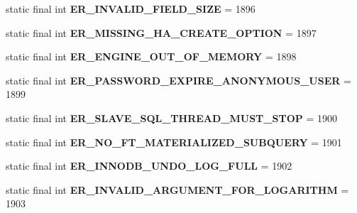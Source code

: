 \begin{DoxyCompactItemize}
static final int {\bfseries E\+R\+\_\+\+I\+N\+V\+A\+L\+I\+D\+\_\+\+F\+I\+E\+L\+D\+\_\+\+S\+I\+ZE} = 1896
\item 
\mbox{\label{classcom_1_1mysql_1_1jdbc_1_1_mysql_error_numbers_aecd3449fd42daf16bb620fba01c78c19}} 
static final int {\bfseries E\+R\+\_\+\+M\+I\+S\+S\+I\+N\+G\+\_\+\+H\+A\+\_\+\+C\+R\+E\+A\+T\+E\+\_\+\+O\+P\+T\+I\+ON} = 1897
\item 
\mbox{\label{classcom_1_1mysql_1_1jdbc_1_1_mysql_error_numbers_a9d574c71aee52af3e2d54cef3ee07a3a}} 
static final int {\bfseries E\+R\+\_\+\+E\+N\+G\+I\+N\+E\+\_\+\+O\+U\+T\+\_\+\+O\+F\+\_\+\+M\+E\+M\+O\+RY} = 1898
\item 
\mbox{\label{classcom_1_1mysql_1_1jdbc_1_1_mysql_error_numbers_ac57d765d78e94473b0d8706706491741}} 
static final int {\bfseries E\+R\+\_\+\+P\+A\+S\+S\+W\+O\+R\+D\+\_\+\+E\+X\+P\+I\+R\+E\+\_\+\+A\+N\+O\+N\+Y\+M\+O\+U\+S\+\_\+\+U\+S\+ER} = 1899
\item 
\mbox{\label{classcom_1_1mysql_1_1jdbc_1_1_mysql_error_numbers_a51f840d671bfa27756f2d97104673652}} 
static final int {\bfseries E\+R\+\_\+\+S\+L\+A\+V\+E\+\_\+\+S\+Q\+L\+\_\+\+T\+H\+R\+E\+A\+D\+\_\+\+M\+U\+S\+T\+\_\+\+S\+T\+OP} = 1900
\item 
\mbox{\label{classcom_1_1mysql_1_1jdbc_1_1_mysql_error_numbers_a015ad90d17755ba2ffce511033e00658}} 
static final int {\bfseries E\+R\+\_\+\+N\+O\+\_\+\+F\+T\+\_\+\+M\+A\+T\+E\+R\+I\+A\+L\+I\+Z\+E\+D\+\_\+\+S\+U\+B\+Q\+U\+E\+RY} = 1901
\item 
\mbox{\label{classcom_1_1mysql_1_1jdbc_1_1_mysql_error_numbers_a88745567053e3df4f533f3a1ca334361}} 
static final int {\bfseries E\+R\+\_\+\+I\+N\+N\+O\+D\+B\+\_\+\+U\+N\+D\+O\+\_\+\+L\+O\+G\+\_\+\+F\+U\+LL} = 1902
\item 
\mbox{\label{classcom_1_1mysql_1_1jdbc_1_1_mysql_error_numbers_a4ee45146f63b3f61d24d44758ad5ec90}} 
static final int {\bfseries E\+R\+\_\+\+I\+N\+V\+A\+L\+I\+D\+\_\+\+A\+R\+G\+U\+M\+E\+N\+T\+\_\+\+F\+O\+R\+\_\+\+L\+O\+G\+A\+R\+I\+T\+HM} = 1903

\end{DoxyCompactItemize}
